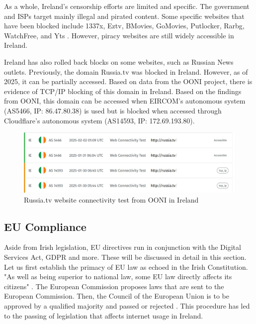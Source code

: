As a whole, Ireland's censorship efforts are limited and specific. The government and ISPs target mainly illegal and pirated content. Some specific websites that have been blocked include 1337x, Eztv, BMovies, GoMovies, Putlocker, Rarbg, WatchFree, and Yts \cite{siliconrepublicMovieIndustry}. However, piracy websites are still widely accessible in Ireland.

Ireland has also rolled back blocks on some websites, such as Russian News outlets. Previously, the domain Russia.tv was blocked in Ireland. However, as of 2025, it can be partially accessed. Based on data from the OONI project, there is evidence of TCP/IP blocking of this domain in Ireland. Based on the findings from OONI, this domain can be accessed when EIRCOM's autonomous system (AS5466, IP: 86.47.80.38) is used but is blocked when accessed through Cloudflare's autonomous system (AS14593, IP: 172.69.193.80).


\begin{figure}[H]
    \centering
    \includegraphics[width=\textwidth]{Griff/TCD SCSS CAPSTONE/Literature Review/RussiaTV search OONI.jpg}
    \caption{Russia.tv website connectivity test from OONI in Ireland}
    \label{fig:RussiaTV-OONI-TEST-IRELAND}
\end{figure}

\subsection{EU Compliance}
\label{sec:Chris-EU-Compliance}

Aside from Irish legislation, EU directives run in conjunction with the Digital Services Act, GDPR and more. These will be discussed in detail in this section. Let us first establish the primacy of EU law as echoed in the Irish Constitution. "As well as being superior to national law, some EU law directly affects its citizens" \cite{citizensinformation2025}. The European Commission proposes laws that are sent to the European Commission. Then, the Council of the European Union is to be approved by a qualified majority and passed or rejected \cite{europa2025}. This procedure has led to the passing of legislation that affects internet usage in Ireland. 

